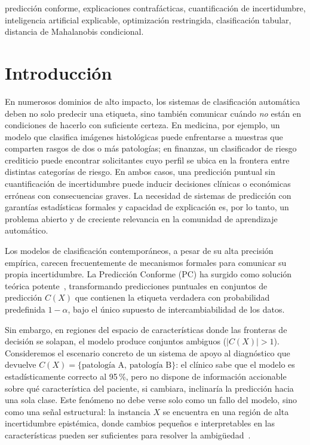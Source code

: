 \documentclass[conference]{IEEEtran}
\begin{document}
\begin{IEEEkeywords}
predicción conforme, explicaciones contrafácticas, cuantificación de
incertidumbre, inteligencia artificial explicable, optimización restringida,
clasificación tabular, distancia de Mahalanobis condicional.
\end{IEEEkeywords}

\section{Introducción}

En numerosos dominios de alto impacto, los sistemas de clasificación
automática deben no solo predecir una etiqueta, sino también comunicar
cuándo \emph{no} están en condiciones de hacerlo con suficiente certeza.
En medicina, por ejemplo, un modelo que clasifica imágenes histológicas
puede enfrentarse a muestras que comparten rasgos de dos o más patologías;
en finanzas, un clasificador de riesgo crediticio puede encontrar
solicitantes cuyo perfil se ubica en la frontera entre distintas categorías
de riesgo. En ambos casos, una predicción puntual sin cuantificación de
incertidumbre puede inducir decisiones clínicas o económicas erróneas con
consecuencias graves. La necesidad de sistemas de predicción con garantías
estadísticas formales y capacidad de explicación es, por lo tanto, un
problema abierto y de creciente relevancia en la comunidad de aprendizaje
automático.

Los modelos de clasificación contemporáneos, a pesar de su alta precisión
empírica, carecen frecuentemente de mecanismos formales para comunicar su
propia incertidumbre. La Predicción Conforme (PC) ha surgido como solución
teórica potente~\cite{b3}, transformando predicciones puntuales en conjuntos
de predicción $C(X)$ que contienen la etiqueta verdadera con probabilidad
predefinida $1-\alpha$, bajo el único supuesto de intercambiabilidad de los
datos.

Sin embargo, en regiones del espacio de características donde las fronteras
de decisión se solapan, el modelo produce conjuntos ambiguos ($|C(X)| > 1$).
Consideremos el escenario concreto de un sistema de apoyo al diagnóstico que
devuelve $C(X) = \{\text{patología A},\, \text{patología B}\}$: el clínico
sabe que el modelo es estadísticamente correcto al 95\,\%, pero no dispone de
información accionable sobre qué característica del paciente, si cambiara,
inclinaría la predicción hacia una sola clase. Este fenómeno no debe verse
solo como un fallo del modelo, sino como una señal estructural: la instancia
$X$ se encuentra en una región de alta incertidumbre epistémica, donde
cambios pequeños e interpretables en las características pueden ser
suficientes para resolver la ambigüedad~\cite{b1}.
\end{document}
